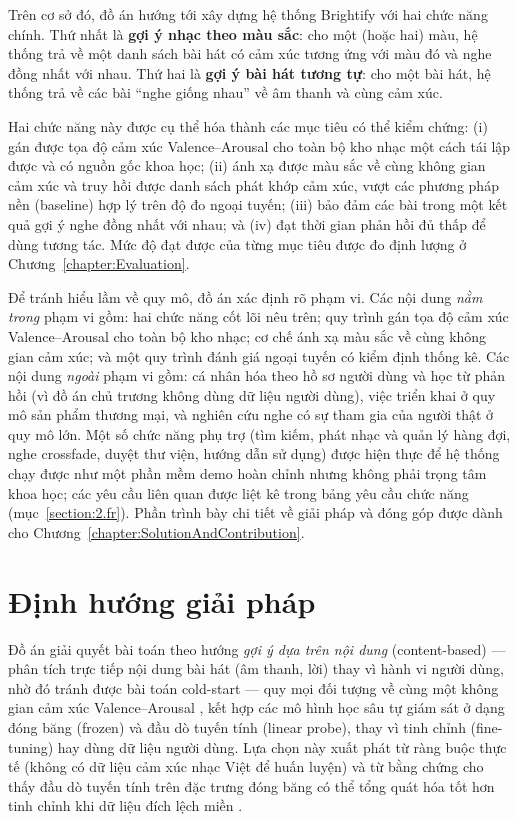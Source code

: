 \documentclass[../DoAn.tex]{subfiles}
\begin{document}
Trên cơ sở đó, đồ án hướng tới xây dựng hệ thống Brightify với hai chức năng chính. Thứ nhất là \textbf{gợi ý nhạc theo màu sắc}: cho một (hoặc hai) màu, hệ thống trả về một danh sách bài hát có cảm xúc tương ứng với màu đó và nghe đồng nhất với nhau. Thứ hai là \textbf{gợi ý bài hát tương tự}: cho một bài hát, hệ thống trả về các bài ``nghe giống nhau'' về âm thanh và cùng cảm xúc.

Hai chức năng này được cụ thể hóa thành các mục tiêu có thể kiểm chứng: (i) gán được tọa độ cảm xúc Valence--Arousal cho toàn bộ kho nhạc một cách tái lập được và có nguồn gốc khoa học; (ii) ánh xạ được màu sắc về cùng không gian cảm xúc và truy hồi được danh sách phát khớp cảm xúc, vượt các phương pháp nền (baseline) hợp lý trên độ đo ngoại tuyến; (iii) bảo đảm các bài trong một kết quả gợi ý nghe đồng nhất với nhau; và (iv) đạt thời gian phản hồi đủ thấp để dùng tương tác. Mức độ đạt được của từng mục tiêu được đo định lượng ở Chương~\ref{chapter:Evaluation}.

Để tránh hiểu lầm về quy mô, đồ án xác định rõ phạm vi. Các nội dung \textit{nằm trong} phạm vi gồm: hai chức năng cốt lõi nêu trên; quy trình gán tọa độ cảm xúc Valence--Arousal cho toàn bộ kho nhạc; cơ chế ánh xạ màu sắc về cùng không gian cảm xúc; và một quy trình đánh giá ngoại tuyến có kiểm định thống kê. Các nội dung \textit{ngoài} phạm vi gồm: cá nhân hóa theo hồ sơ người dùng và học từ phản hồi (vì đồ án chủ trương không dùng dữ liệu người dùng), việc triển khai ở quy mô sản phẩm thương mại, và nghiên cứu nghe có sự tham gia của người thật ở quy mô lớn. Một số chức năng phụ trợ (tìm kiếm, phát nhạc và quản lý hàng đợi, nghe crossfade, duyệt thư viện, hướng dẫn sử dụng) được hiện thực để hệ thống chạy được như một phần mềm demo hoàn chỉnh nhưng không phải trọng tâm khoa học; các yêu cầu liên quan được liệt kê trong bảng yêu cầu chức năng (mục~\ref{section:2.fr}). Phần trình bày chi tiết về giải pháp và đóng góp được dành cho Chương~\ref{chapter:SolutionAndContribution}.

\section{Định hướng giải pháp}
\label{section:1.3}
Đồ án giải quyết bài toán theo hướng \textit{gợi ý dựa trên nội dung} (content-based) \cite{aggarwal2016recsys} --- phân tích trực tiếp nội dung bài hát (âm thanh, lời) thay vì hành vi người dùng, nhờ đó tránh được bài toán cold-start --- quy mọi đối tượng về cùng một không gian cảm xúc Valence--Arousal \cite{russell1980circumplex}, kết hợp các mô hình học sâu tự giám sát ở dạng đóng băng (frozen) và đầu dò tuyến tính (linear probe), thay vì tinh chỉnh (fine-tuning) hay dùng dữ liệu người dùng. Lựa chọn này xuất phát từ ràng buộc thực tế (không có dữ liệu cảm xúc nhạc Việt để huấn luyện) và từ bằng chứng cho thấy đầu dò tuyến tính trên đặc trưng đóng băng có thể tổng quát hóa tốt hơn tinh chỉnh khi dữ liệu đích lệch miền \cite{kumar2022finetuning}.
\end{document}
